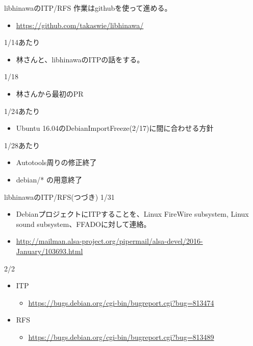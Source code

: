 \begin{frame}{libhinawaのITP/RFS}
  作業はgithubを使って進める。
  \begin{itemize}
  \item \url{https://github.com/takaswie/libhinawa/}
  \end{itemize}
  1/14あたり
  \begin{itemize}
  \item 林さんと、libhinawaのITPの話をする。
  \end{itemize}
  1/18
  \begin{itemize}
  \item 林さんから最初のPR
  \end{itemize}
  1/24あたり
  \begin{itemize}
  \item Ubuntu 16.04のDebianImportFreeze(2/17)に間に合わせる方針
  \end{itemize}
  1/28あたり
  \begin{itemize}
  \item Autotools周りの修正終了
  \item debian/* の用意終了
  \end{itemize}
\end{frame}
\begin{frame}{libhinawaのITP/RFS(つづき)}
  1/31
  \begin{itemize}
  \item DebianプロジェクトにITPすることを、Linux FireWire subsystem,
        Linux sound subsystem、FFADOに対して連絡。
  \item
\url{http://mailman.alsa-project.org/pipermail/alsa-devel/2016-January/103693.html}
  \end{itemize}
  2/2
  \begin{itemize}
  \item ITP
  \begin{itemize}
  \item \url{https://bugs.debian.org/cgi-bin/bugreport.cgi?bug=813474}
  \end{itemize}
  \item RFS
  \begin{itemize}
  \item \url{https://bugs.debian.org/cgi-bin/bugreport.cgi?bug=813489}
  \end{itemize}
  \end{itemize}
\end{frame}

